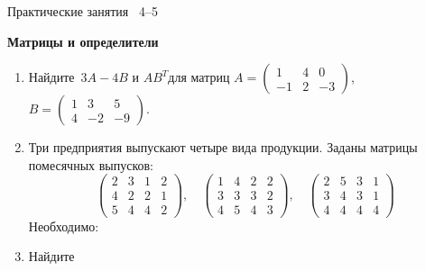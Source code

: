 \documentclass[a4paper,14pt]{extarticle}
\begin{document}
{\centering \small Практические занятия \textnumero~4--5 \par\bfseries \large Матрицы и определители\par}

\begin{enumerate}
\item 
	Найдите~$3A-4B$ и $AB^T$для матриц $A=\begin{pmatrix} 1& 4& 0 \\-1& 2& -3 \end{pmatrix}$, $B=\begin{pmatrix} 1& 3& 5 \\ 4&-2& -9 \end{pmatrix}$.

\item 
	Три предприятия выпускают четыре вида продукции. Заданы матрицы помесячных выпусков:
	$$
	\begin{pmatrix}
		2 & 3 & 1 & 2 \\
		4 & 2 & 2 & 1 \\
		5 & 4 & 4 & 2
	\end{pmatrix},
	\quad
	\begin{pmatrix}
		1 & 4 & 2 & 2 \\
		3 & 3 & 3 & 2 \\
		4 & 5 & 4 & 3
	\end{pmatrix},
	\quad
	\begin{pmatrix}
		2 & 5 & 3 & 1 \\
		3 & 4 & 3 & 1 \\
		4 & 4 & 4 & 4
	\end{pmatrix}
	$$
Необходимо: 

\item Найдите 


\end{enumerate}
\end{document}
